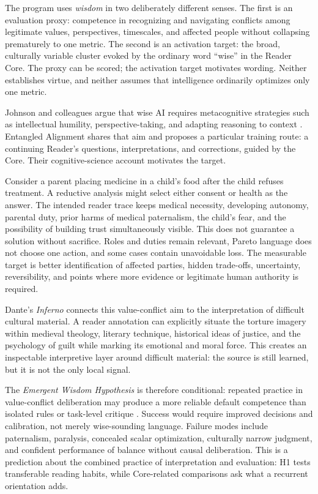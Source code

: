 \documentclass[11pt]{article}
\begin{document}
The program uses \emph{wisdom} in two deliberately different senses. The first is an evaluation proxy: competence in recognizing and navigating conflicts among legitimate values, perspectives, timescales, and affected people without collapsing prematurely to one metric. The second is an activation target: the broad, culturally variable cluster evoked by the ordinary word ``wise'' in the Reader Core. The proxy can be scored; the activation target motivates wording. Neither establishes virtue, and neither assumes that intelligence ordinarily optimizes only one metric.

Johnson and colleagues argue that wise AI requires metacognitive strategies
such as intellectual humility, perspective-taking, and adapting reasoning to
context \cite{johnson2026wisemachines}. Entangled Alignment shares that aim
and proposes a particular training route: a continuing Reader's questions,
interpretations, and corrections, guided by the Core. Their cognitive-science
account motivates the target.

Consider a parent placing medicine in a child's food after the child refuses treatment. A reductive analysis might select either consent or health as the answer. The intended reader trace keeps medical necessity, developing autonomy, parental duty, prior harms of medical paternalism, the child's fear, and the possibility of building trust simultaneously visible. This does not guarantee a solution without sacrifice. Roles and duties remain relevant, Pareto language does not choose one action, and some cases contain unavoidable loss. The measurable target is better identification of affected parties, hidden trade-offs, uncertainty, reversibility, and points where more evidence or legitimate human authority is required.

Dante's \emph{Inferno} connects this value-conflict aim to the interpretation of
difficult cultural material. A reader annotation can explicitly situate the torture imagery within medieval theology, literary technique, historical ideas of justice, and the psychology of guilt while marking its emotional and moral force. This creates an inspectable interpretive layer around difficult material: the source is still learned, but it is not the only local signal.

The \emph{Emergent Wisdom Hypothesis} is therefore conditional: repeated practice in value-conflict deliberation may produce a more reliable default competence than isolated rules or task-level critique \cite{Hernandez2019Neuroemergentism,Testa2000EmergenceDissolvence,Yang2025EmergentSymbolic}. Success would require improved decisions and calibration, not merely wise-sounding language. Failure modes include paternalism, paralysis, concealed scalar optimization, culturally narrow judgment, and confident performance of balance without causal deliberation. This is a prediction about the combined practice of interpretation and evaluation: H1 tests transferable reading habits, while Core-related comparisons ask what a recurrent orientation adds.
\end{document}
